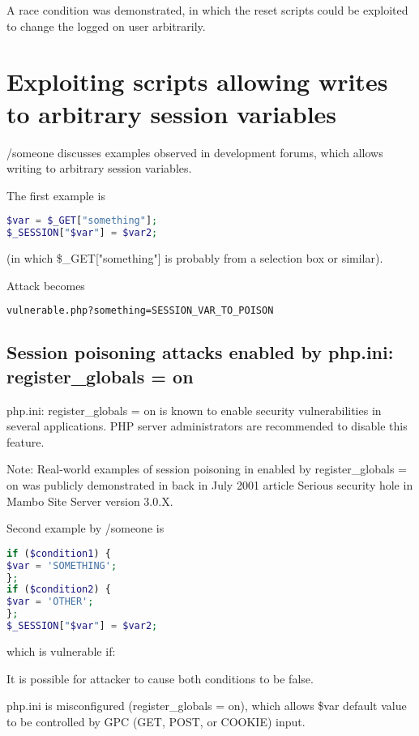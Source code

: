 A race condition was demonstrated, in which the reset scripts could be exploited to change the logged on user arbitrarily.





\section{Exploiting scripts allowing writes to arbitrary session variables}


/someone discusses examples observed in development forums, which allows writing to arbitrary session variables.

The first example is

\begin{lstlisting}[language=PHP]
$var = $_GET["something"]; 
$_SESSION["$var"] = $var2; 
\end{lstlisting}

(in which \$\_GET["something"] is probably from a selection box or similar).


Attack becomes

\begin{lstlisting}[language=bash]
vulnerable.php?something=SESSION_VAR_TO_POISON
\end{lstlisting}




\subsection{Session poisoning attacks enabled by php.ini: register\_globals = on}


php.ini: register\_globals = on is known to enable security vulnerabilities in several applications. PHP server administrators are recommended to disable this feature.

Note: Real-world examples of session poisoning in enabled by register\_globals = on was publicly demonstrated in back in July 2001 article Serious security hole in Mambo Site Server version 3.0.X.

Second example by /someone is


\begin{lstlisting}[language=PHP]
if ($condition1) { 
$var = 'SOMETHING'; 
}; 
if ($condition2) { 
$var = 'OTHER'; 
}; 
$_SESSION["$var"] = $var2; 
\end{lstlisting}

which is vulnerable if:

\begin{compactitem}
\item It is possible for attacker to cause both conditions to be false.
\item php.ini is misconfigured (register\_globals = on), which allows \$var default value to be controlled by GPC (GET, POST, or COOKIE) input.

\end{compactitem}

